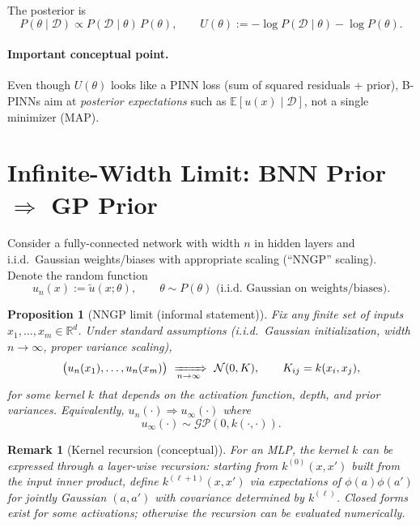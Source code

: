 \documentclass[11pt]{article}
\newtheorem{proposition}{Proposition}
\newtheorem{remark}{Remark}
\begin{document}
The posterior is
\begin{equation}
P(\theta\mid \mathcal D)\propto P(\mathcal D\mid \theta)\,P(\theta),
\qquad
U(\theta):=-\log P(\mathcal D\mid \theta)-\log P(\theta).
\end{equation}

\paragraph{Important conceptual point.}
Even though $U(\theta)$ looks like a PINN loss (sum of squared residuals + prior), B-PINNs aim at
\emph{posterior expectations} such as $\mathbb E[u(x)\mid \mathcal D]$, not a single minimizer (MAP).

\section{Infinite-Width Limit: BNN Prior $\Rightarrow$ GP Prior}

Consider a fully-connected network with width $n$ in hidden layers and i.i.d.\ Gaussian weights/biases
with appropriate scaling (``NNGP'' scaling). Denote the random function
\begin{equation}
u_n(x):=\tilde u(x;\theta),\qquad \theta\sim P(\theta) \text{ (i.i.d.\ Gaussian on weights/biases).}
\end{equation}

\begin{proposition}[NNGP limit (informal statement)]
Fix any finite set of inputs $x_1,\dots,x_m\in \mathbb R^d$.
Under standard assumptions (i.i.d.\ Gaussian initialization, width $n\to\infty$, proper variance scaling),
\begin{equation}
\big(u_n(x_1),\dots,u_n(x_m)\big)\ \xRightarrow[n\to\infty]{}\ \mathcal N(0, K),
\qquad K_{ij}=k(x_i,x_j),
\end{equation}
for some kernel $k$ that depends on the activation function, depth, and prior variances.
Equivalently, $u_n(\cdot)\Rightarrow u_\infty(\cdot)$ where
\begin{equation}
u_\infty(\cdot)\sim \mathcal{GP}(0,k(\cdot,\cdot)).
\end{equation}
\end{proposition}

\begin{remark}[Kernel recursion (conceptual)]
For an MLP, the kernel $k$ can be expressed through a layer-wise recursion:
starting from $k^{(0)}(x,x')$ built from the input inner product, define
$k^{(\ell+1)}(x,x')$ via expectations of $\phi(a)\phi(a')$ for jointly Gaussian $(a,a')$ with covariance
determined by $k^{(\ell)}$.
Closed forms exist for some activations; otherwise the recursion can be evaluated numerically.
\end{remark}
\end{document}
